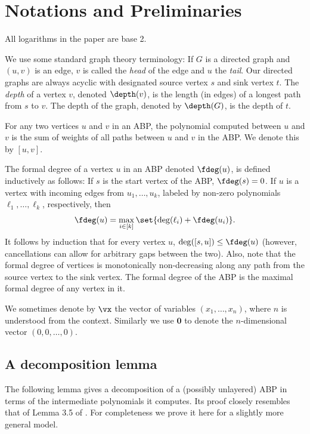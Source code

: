 \setcounter{section}{1}
\setcounter{theorem}{3}
\section{Notations and Preliminaries}
All logarithms in the paper are base 2.

We use some standard graph theory terminology: If $G$ is a directed graph and $(u,v)$ is an edge, $v$ is called the \emph{head} of the edge and $u$ the \emph{tail}. Our directed graphs are always acyclic with designated source vertex $s$ and sink vertex $t$. The \emph{depth} of a vertex $v$, denoted $\depth(v)$, is the length (in edges) of a longest path from $s$ to $v$. The depth of the graph, denoted by $\depth(G)$, is the depth of $t$.

For any two vertices $u$ and $v$ in an ABP, the polynomial computed between $u$ and $v$ is the sum of weights of all paths between $u$ and $v$  in the ABP. We denote this by $[u,v]$. 

The formal degree of a vertex $u$ in an ABP denoted $\fdeg(u)$, is defined inductively as follows: If $s$ is the start vertex of the ABP, $\fdeg(s)=0$. If $u$ is a vertex with incoming edges from $u_1, \ldots, u_k$, labeled by non-zero polynomials $\ell_1, \ldots, \ell_k$, respectively, then
\[
\fdeg(u) = \max_{i \in [k]} \set{ \deg(\ell_i) + \fdeg(u_i) }.
\]
It follows by induction that for every vertex $u$, $\deg ([s,u]) \le \fdeg(u)$ (however, cancellations can allow for arbitrary gaps between the two). Also, note that the formal degree of vertices is monotonically non-decreasing along any path from the source vertex to the sink vertex. The formal degree of the ABP is the maximal formal degree of any vertex in it.

We sometimes denote by $\vx$ the vector of variables $(x_1, \ldots, x_n)$, where $n$ is understood from the context. Similarly we use $\mathbf{0}$ to denote the $n$-dimensional vector $(0,0,\ldots,0)$.

	

\subsection{A decomposition lemma}
The following lemma gives a decomposition of a (possibly unlayered) ABP in terms of the intermediate polynomials it computes. Its proof closely resembles that of Lemma 3.5 of \cite{K19}. For completeness we prove it here for a slightly more general model.

